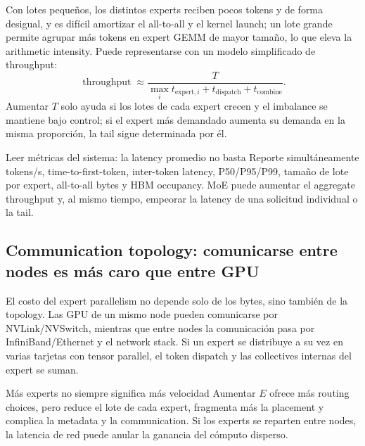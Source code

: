 Con lotes pequeños, los distintos experts reciben pocos tokens y de forma desigual, y es difícil amortizar el all-to-all y el kernel launch; un lote grande permite agrupar más tokens en expert GEMM de mayor tamaño, lo que eleva la arithmetic intensity. Puede representarse con un modelo simplificado de throughput:
\[
\operatorname{throughput}\approx \frac{T}{\max_i t_{\text{expert},i}+t_{\text{dispatch}}+t_{\text{combine}}}.
\]
Aumentar $T$ solo ayuda si los lotes de cada expert crecen y el imbalance se mantiene bajo control; si el expert más demandado aumenta su demanda en la misma proporción, la tail sigue determinada por él.

\begin{knowledgebox}{Leer métricas del sistema: la latency promedio no basta}
Reporte simultáneamente tokens/s, time-to-first-token, inter-token latency, P50/P95/P99, tamaño de lote por expert, all-to-all bytes y HBM occupancy. MoE puede aumentar el aggregate throughput y, al mismo tiempo, empeorar la latency de una solicitud individual o la tail.
\end{knowledgebox}


\subsection{Communication topology: comunicarse entre nodes es más caro que entre GPU}

El costo del expert parallelism no depende solo de los bytes, sino también de la topology. Las GPU de un mismo node pueden comunicarse por NVLink/NVSwitch, mientras que entre nodes la comunicación pasa por InfiniBand/Ethernet y el network stack. Si un expert se distribuye a su vez en varias tarjetas con tensor parallel, el token dispatch y las collectives internas del expert se suman.

\begin{warningbox}{Más experts no siempre significa más velocidad}
Aumentar $E$ ofrece más routing choices, pero reduce el lote de cada expert, fragmenta más la placement y complica la metadata y la communication. Si los experts se reparten entre nodes, la latencia de red puede anular la ganancia del cómputo disperso.
\end{warningbox}

